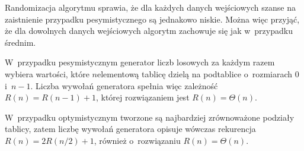 
\exercise %
Randomizacja algorytmu sprawia, że dla każdych danych wejściowych szanse na zaistnienie przypadku pesymistycznego są jednakowo niskie.
Można więc przyjąć, że dla dowolnych danych wejściowych algorytm zachowuje się jak w~przypadku średnim.

\exercise %
W~przypadku pesymistycznym generator liczb losowych za każdym razem wybiera wartości, które $n$\nbhyphen elementową tablicę dzielą na podtablice o~rozmiarach 0 i~$n-1$.
Liczba wywołań generatora spełnia więc zależność $R(n)=R(n-1)+1$, której rozwiązaniem jest $R(n)=\Theta(n)$.

W~przypadku optymistycznym tworzone są najbardziej zrównoważone podziały tablicy, zatem liczbę wywołań generatora opisuje wówczas rekurencja $R(n)=2R(n/2)+1$, również o~rozwiązaniu $R(n)=\Theta(n)$.
